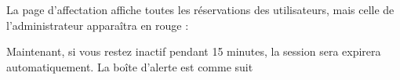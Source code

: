 \documentclass{article}
\begin{document}
\begin{enumerate}
               \noindent{}
  
  
  La page d'affectation affiche toutes les réservations des utilisateurs, mais celle de l'administrateur apparaîtra en rouge :
  
  \vspace{0.7cm}
               \hspace*{-0.7in}
               \noindent{}
               
               
    \vspace{4cm}           
               Maintenant, si vous restez inactif pendant 15 minutes, la session sera expirera automatiquement. La boîte d'alerte est comme suit
  

\end{enumerate}
\end{document}
